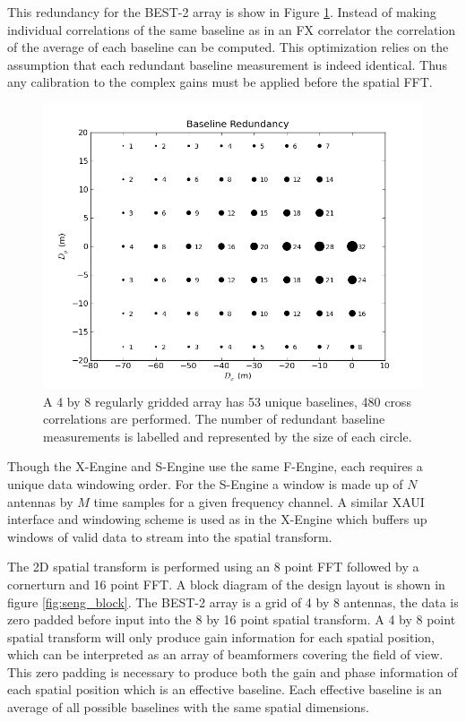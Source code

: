 \documentclass[useAMS,macros,usenatbib]{mn2e}
\begin{document}
This redundancy for the BEST-2 array is show in Figure \ref{fig:redbl}.
Instead of making individual correlations of the same baseline as in an FX correlator the correlation of the average of each baseline can be computed.
This optimization relies on the assumption that each redundant baseline measurement is indeed identical.
Thus any calibration to the complex gains must be applied before the spatial FFT.

\begin{figure}
    \centering
    \includegraphics[width=\linewidth]{graphics/redbl.png}
    \caption{A 4 by 8 regularly gridded array has 53 unique baselines, 480 cross correlations are performed. The number of redundant baseline measurements is labelled and represented by the size of each circle.}
    \label{fig:redbl}
\end{figure}

Though the X-Engine and S-Engine use the same F-Engine, each requires a unique data windowing order.
For the S-Engine a window is made up of $N$ antennas by $M$ time samples for a given frequency channel.
A similar XAUI interface and windowing scheme is used as in the X-Engine which buffers up windows of valid data to stream into the spatial transform.

The 2D spatial transform is performed using an 8 point FFT followed by a cornerturn and 16 point FFT.
A block diagram of the design layout is shown in figure \ref{fig:seng_block}.
The BEST-2 array is a grid of 4 by 8 antennas, the data is zero padded before input into the 8 by 16 point spatial transform.
A 4 by 8 point spatial transform will only produce gain information for each spatial position, which can be interpreted as an array of beamformers covering the field of view.
This zero padding is necessary to produce both the gain and phase information of each spatial position which is an effective baseline.
Each effective baseline is an average of all possible baselines with the same spatial dimensions.
\end{document}
